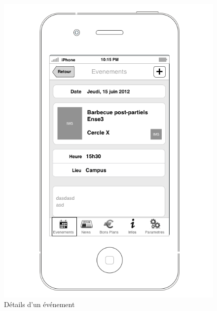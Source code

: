\documentclass[a4paper, 11px]{article}
\begin{document}
\begin{figure}[htbp]
	\begin{minipage}[c]{.50\linewidth}
		\begin{center}
			\includegraphics[scale=0.3]{../../Sketch/iOS/evenements_detail.png}
		\end{center}
	\caption{Détails d'un événement}
	\end{minipage}
	\hfill
	\begin{minipage}[c]{.50\linewidth}
		\begin{center}

\end{center}
\end{minipage}
\end{figure}
\end{document}
